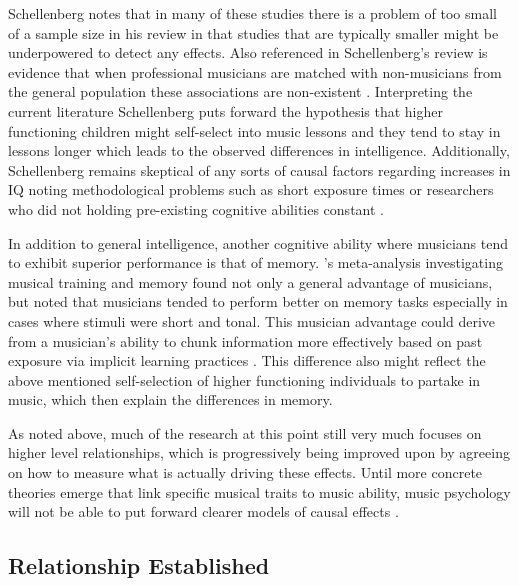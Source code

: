 \documentclass[]{book}
\begin{document}
Schellenberg \citep{schellenbergMusicNonmusicalAbilities2017} notes that in many of these studies there is a problem of too small of a sample size in his review \citep{corrigallAssociationsLengthMusic2011, parbery-clarkMusicalExperienceAging2011, straitMusicalTrainingEarly2012} in that studies that are typically smaller might be underpowered to detect any effects.
Also referenced in Schellenberg's review is evidence that when professional musicians are matched with non-musicians from the general population these associations are non-existent \citep{schellenbergMusicTrainingSpeech2015}.
Interpreting the current literature Schellenberg puts forward the hypothesis that higher functioning children might self-select into music lessons and they tend to stay in lessons longer which leads to the observed differences in intelligence.
Additionally, Schellenberg remains skeptical of any sorts of causal factors regarding increases in IQ \citep{francoisMusicTrainingDevelopment2013, morenoMusicalTrainingInfluences2009} noting methodological problems such as short exposure times or researchers who did not holding pre-existing cognitive abilities constant \citep{mehrTwoRandomizedTrials2013}.

In addition to general intelligence, another cognitive ability where musicians tend to exhibit superior performance is that of memory.
\citet{talaminiMusiciansHaveBetter2017}'s meta-analysis investigating musical training and memory found not only a general advantage of musicians, but noted that musicians tended to perform better on memory tasks especially in cases where stimuli were short and tonal.
This musician advantage could derive from a musician's ability to chunk information more effectively based on past exposure via implicit learning practices \citep{ettlingerImplicitMemoryMusic2011, rohrmeierImplicitLearningAcquisition2012}.
This difference also might reflect the above mentioned self-selection of higher functioning individuals to partake in music, which then explain the differences in memory.

As noted above, much of the research at this point still very much focuses on higher level relationships, which is progressively being improved upon by agreeing on how to measure what is actually driving these effects.
Until more concrete theories emerge that link specific musical traits to music ability, music psychology will not be able to put forward clearer models of causal effects \citep{bakerExaminingMusicalSophistication2018}.

\hypertarget{relationship-established}{%
\subsection{Relationship Established}\label{relationship-established}}
\end{document}

